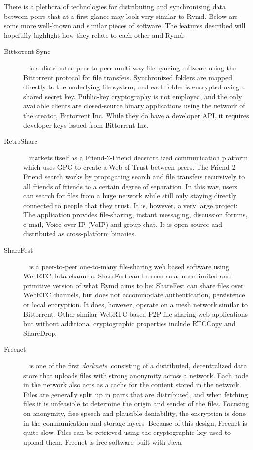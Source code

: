 There is a plethora of technologies for distributing and synchronizing data between peers that at a first glance may look very similar to Rymd. Below are some more well-known and similar pieces of software. The features described will hopefully highlight how they relate to each other and Rymd.

\begin{description}
  \item[Bittorrent Sync]~\cite{BitTorent:2014:Online} is a distributed peer-to-peer multi-way file syncing software using the Bittorrent protocol for file transfers. Synchronized folders are mapped directly to the underlying file system, and each folder is encrypted using a shared secret key. Public-key cryptography is not employed, and the only available clients are closed-source binary applications using the network of the creator, Bittorrent Inc. While they do have a developer API, it requires developer keys issued from Bittorrent Inc.
  \item[RetroShare]~\cite{Retroshare:2014:Online} markets itself as a Friend-2-Friend decentralized communication platform which uses GPG to create a Web of Trust between peers. The Friend-2-Friend search works by propagating search and file transfers recursively to all friends of friends to a certain degree of separation. In this way, users can search for files from a huge network while still only staying directly connected to people that they trust. It is, however, a very large project: The application provides file-sharing, instant messaging, discussion forums, e-mail, Voice over IP (VoIP) and group chat. It is open source and distributed as cross-platform binaries.
  \item[ShareFest]~\cite{Sharefest:2014:Online} is a peer-to-peer one-to-many file-sharing web based software using WebRTC data channels. ShareFest can be seen as a more limited and primitive version of what Rymd aims to be: ShareFest can share files over WebRTC channels, but does not accommodate authentication, persistence or local encryption. It does, however, operate on a mesh network similar to Bittorrent. Other similar WebRTC-based P2P file sharing web applications but without additional cryptographic properties include RTCCopy and ShareDrop.
  \item[Freenet]~\cite{Freenet:2014:Online} is one of the first \emph{darknets}, consisting of a distributed, decentralized data store that uploads files with strong anonymity across a network. Each node in the network also acts as a cache for the content stored in the network. Files are generally split up in parts that are distributed, and when fetching files it is unfeasible to determine the origin and sender of the files. Focusing on anonymity, free speech and plausible deniability, the encryption is done in the communication and storage layers. Because of this design, Freenet is quite slow. Files can be retrieved using the cryptographic key used to upload them. Freenet is free software built with Java.

\end{description}
